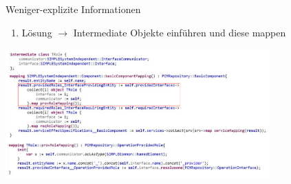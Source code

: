 \begin{frame}{Weniger-explizite Informationen}
	\begin{enumerate}
		\item Lösung $\rightarrow$ Intermediate Objekte einführen und diese mappen
	\end{enumerate}
	\centering
	\includegraphics[height=50mm]{figures/intermediate-objekte.png}
\end{frame}